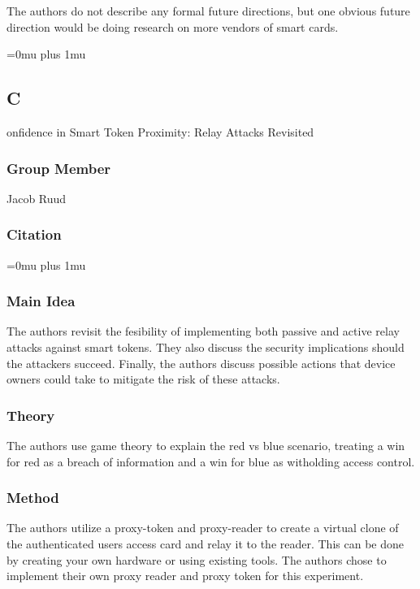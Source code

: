 \noindent
The authors do not describe any formal future directions, but one obvious future direction would be doing research on more vendors of smart cards.

\Urlmuskip=0mu plus 1mu\relax

\noindent
\subsection{C}onfidence in {S}mart {T}oken {P}roximity: {R}elay {A}ttacks {R}evisited

\subsubsection{Group Member}

\noindent
Jacob Ruud

\noindent
\subsubsection{Citation}

\Urlmuskip=0mu plus 1mu\relax

\subsubsection{Main Idea}

\noindent
The authors revisit the fesibility of implementing both passive and active relay attacks against smart tokens. They also discuss the security implications should the attackers succeed. Finally, the authors discuss possible actions that device owners could take to mitigate the risk of these attacks.

\subsubsection{Theory}

\noindent
The authors use game theory to explain the red vs blue scenario, treating a win for red as a breach of information and a win for blue as witholding access control.

\subsubsection{Method}

\noindent
The authors utilize a proxy-token and proxy-reader to create a virtual clone of the authenticated users access card and relay it to the reader. This can be done by creating your own hardware or using existing tools. The authors chose to implement their own proxy reader and proxy token for this experiment.

